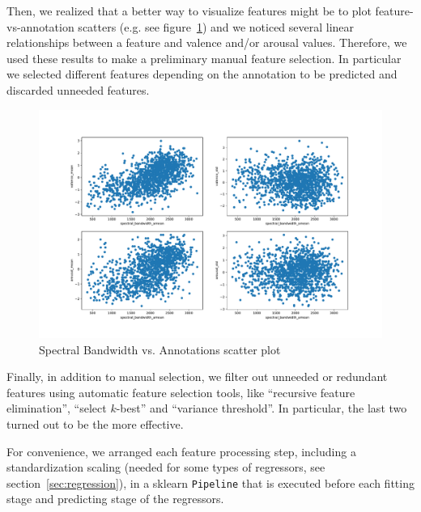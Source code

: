 Then, we realized that a better way to visualize features might be to plot feature-vs-annotation scatters (e.g. see figure~\ref{fig:scatter-spectral_bandwidth_amean}) and we noticed several linear relationships between a feature and valence and/or arousal values. Therefore, we used these results to make a preliminary manual feature selection. In particular we selected different features depending on the annotation to be predicted and discarded unneeded features.

\begin{figure}
	\centering
	\includegraphics[width=1\linewidth]{assets/scatter-spectral_bandwidth_amean.pdf}
	\caption{Spectral Bandwidth vs. Annotations scatter plot}
	\label{fig:scatter-spectral_bandwidth_amean}
\end{figure}

Finally, in addition to manual selection, we filter out unneeded or redundant features using automatic feature selection tools, like ``recursive feature elimination'', ``select $k$-best'' and ``variance threshold''. In particular, the last two turned out to be the more effective.

For convenience, we arranged each feature processing step, including a standardization scaling (needed for some types of regressors, see section~\ref{sec:regression}), in a sklearn \texttt{Pipeline} that is executed before each fitting stage and predicting stage of the regressors.